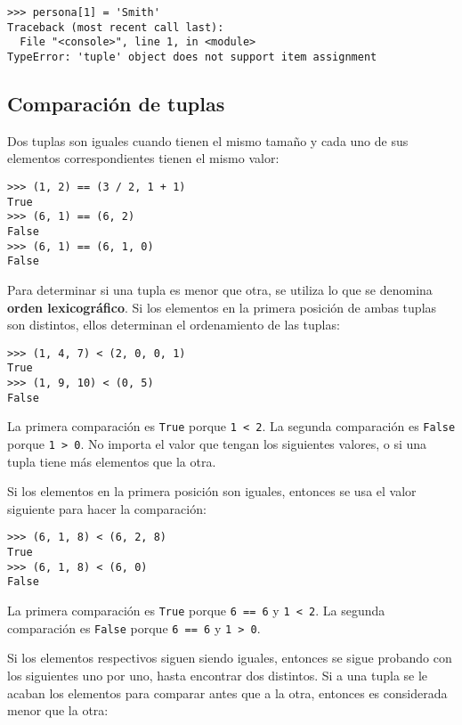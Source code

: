 \begin{lstlisting}
>>> persona[1] = 'Smith'
Traceback (most recent call last):
  File "<console>", line 1, in <module>
TypeError: 'tuple' object does not support item assignment
\end{lstlisting}

\subsection{Comparación de tuplas}

Dos tuplas son iguales cuando tienen el mismo tamaño y cada uno de sus
elementos correspondientes tienen el mismo valor:

\begin{lstlisting}
>>> (1, 2) == (3 / 2, 1 + 1)
True
>>> (6, 1) == (6, 2)
False
>>> (6, 1) == (6, 1, 0)
False
\end{lstlisting}

Para determinar si una tupla es menor que otra, se utiliza lo que se
denomina \textbf{orden lexicográfico}. Si los elementos en la primera
posición de ambas tuplas son distintos, ellos determinan el ordenamiento
de las tuplas:

\begin{lstlisting}
>>> (1, 4, 7) < (2, 0, 0, 1)
True
>>> (1, 9, 10) < (0, 5)
False
\end{lstlisting}

La primera comparación es \lstinline!True! porque \lstinline!1 < 2!. La
segunda comparación es \lstinline!False! porque \lstinline!1 > 0!. No
importa el valor que tengan los siguientes valores, o si una tupla tiene
más elementos que la otra.

Si los elementos en la primera posición son iguales, entonces se usa el
valor siguiente para hacer la comparación:

\begin{lstlisting}
>>> (6, 1, 8) < (6, 2, 8)
True
>>> (6, 1, 8) < (6, 0)
False
\end{lstlisting}

La primera comparación es \lstinline!True! porque \lstinline!6 == 6! y
\lstinline!1 < 2!. La segunda comparación es \lstinline!False! porque
\lstinline!6 == 6! y \lstinline!1 > 0!.

Si los elementos respectivos siguen siendo iguales, entonces se sigue
probando con los siguientes uno por uno, hasta encontrar dos distintos.
Si a una tupla se le acaban los elementos para comparar antes que a la
otra, entonces es considerada menor que la otra:

